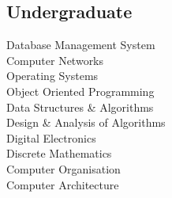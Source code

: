 \documentclass[]{deedy-resume-openfont}
\begin{document}
\begin{minipage}[t]{0.33\textwidth}
\subsection{Undergraduate}
\sectionsep
Database Management System \\
Computer Networks \\
Operating Systems \\
Object Oriented Programming \\
Data Structures \& Algorithms \\
Design \& Analysis of Algorithms \\
Digital Electronics \\
Discrete Mathematics \\
Computer Organisation \\
Computer Architecture \\

%
%

\end{minipage} 
\hfill
\end{document}
